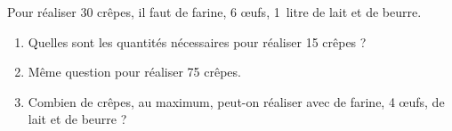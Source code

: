 \begin{exercice*}
   Pour réaliser 30 crêpes, il faut  de farine, 6 œufs, \mbox{1 litre} de lait et  de beurre.
   \begin{enumerate}
      \item Quelles sont les quantités nécessaires pour réaliser 15 crêpes ?
      \item Même question pour réaliser 75 crêpes.
      \item Combien de crêpes, au maximum, peut-on réaliser avec  de farine, 4 œufs,  de lait et  de beurre ?
   \end{enumerate}
\end{exercice*}
